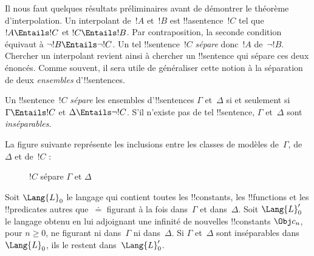 \documentclass[../../../include/open-logic-section]{subfiles}
\begin{document}

Il nous faut quelques résultats préliminaires
avant de démontrer le théorème d'interpolation.
Un interpolant de~$!A$ et~$!B$ est
!!a{sentence}~$!C$ tel que
$!A\Entails !C$ et $!C\Entails !B$.
Par contraposition, la seconde condition
équivaut à $\lnot !B\Entails\lnot !C$.
Un tel !!{sentence}~$!C$ \emph{sépare}
donc~$!A$ de~$\lnot !B$.
Chercher un interpolant revient ainsi
à chercher un !!{sentence} qui sépare
ces deux énoncés. Comme souvent, il sera
utile de généraliser cette notion à la
séparation de deux \emph{ensembles}
d'!!{sentence}s.

\begin{defn}
Un !!{sentence}~$!C$ \emph{sépare}
les ensembles d'!!{sentence}s
$\Gamma$ et~$\Delta$ si et seulement si
$\Gamma\Entails !C$ et
$\Delta\Entails\lnot !C$.
S'il n'existe pas de tel !!{sentence},
$\Gamma$ et~$\Delta$ sont
\emph{inséparables}.
\end{defn}

La figure suivante représente les
inclusions entre les classes de modèles
de~$\Gamma$, de~$\Delta$ et de~$!C$ :
\begin{figure}[h]
  \centering
  \caption{$!C$ sépare $\Gamma$ et $\Delta$}
\end{figure}

\begin{lem}
Soit $\Lang{L}_0$ le langage qui contient
toutes les !!{constant}s,
les !!{function}s et les !!{predicate}s
autres que~$\doteq$ figurant à la fois
dans~$\Gamma$ et dans~$\Delta$.
Soit $\Lang{L}'_0$ le langage obtenu
en lui adjoignant une infinité de
nouvelles !!{constant}s
$\Obj c_n$, pour $n\geq0$, ne figurant ni dans~$\Gamma$ ni dans~$\Delta$.
Si $\Gamma$ et~$\Delta$ sont
inséparables dans~$\Lang{L}_0$,
ils le restent dans~$\Lang{L}'_0$.
\end{lem}
\end{document}
